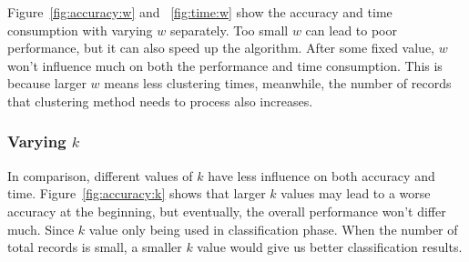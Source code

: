 \documentclass[runningheads]{llncs}
\begin{document}
	Figure~\ref{fig:accuracy:w} and ~\ref{fig:time:w} show the accuracy and time consumption with varying $w$ separately. Too small $w$ can lead to poor performance, but it can also speed up the algorithm. After some fixed value, $w$ won't influence much on both the performance and time consumption. This is because larger $w$ means less clustering times, meanwhile, the number of records that clustering method needs to process also increases. 
	
	\subsubsection{Varying $k$}
	
	In comparison, different values of $k$ have less influence on both accuracy and time. Figure~\ref{fig:accuracy:k} shows that larger $k$ values may lead to a worse accuracy at the beginning, but eventually, the overall performance won't differ much. Since $k$ value only being used in classification phase. When the number of total records is small, a smaller $k$ value would give us  better classification results.
	
\end{document}

